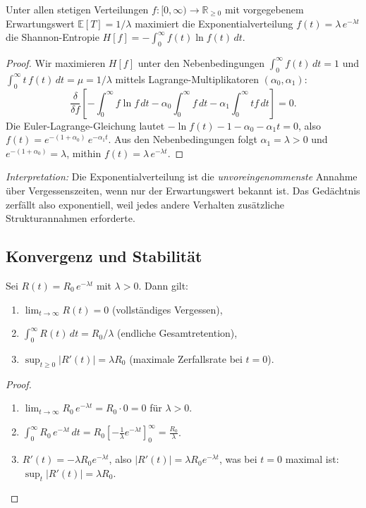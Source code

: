 ﻿\documentclass[12pt,a4paper,twoside]{article}
\theoremstyle{theormstyle}
\theoremstyle{proofstyle}
\begin{document}
		Unter allen stetigen Verteilungen $f : [0,\infty) \to \mathbb{R}_{\geq 0}$
		mit vorgegebenem Erwartungswert $\mathbb{E}[T] = 1/\lambda$ maximiert die
		Exponentialverteilung
		$f(t) = \lambda\,e^{-\lambda t}$
		die Shannon-Entropie
		$H[f] = -\int_0^\infty f(t)\ln f(t)\,dt$.
	
	\begin{proof}
		Wir maximieren $H[f]$ unter den Nebenbedingungen
		$\int_0^\infty f(t)\,dt = 1$ und $\int_0^\infty t\,f(t)\,dt = \mu = 1/\lambda$
		mittels Lagrange-Multiplikatoren $(\alpha_0, \alpha_1)$:
		\[
		\frac{\delta}{\delta f}\!\left[
		-\!\int_0^\infty f\ln f\,dt
		- \alpha_0\!\int_0^\infty f\,dt
		- \alpha_1\!\int_0^\infty t f\,dt
		\right] = 0.
		\]
		Die Euler-Lagrange-Gleichung lautet
		$-\ln f(t) - 1 - \alpha_0 - \alpha_1 t = 0$, also
		$f(t) = e^{-(1+\alpha_0)}\,e^{-\alpha_1 t}$.
		Aus den Nebenbedingungen folgt $\alpha_1 = \lambda > 0$ und
		$e^{-(1+\alpha_0)} = \lambda$, mithin $f(t) = \lambda\,e^{-\lambda t}$.
	\end{proof}
	
	\textit{Interpretation:} Die Exponentialverteilung ist die \emph{unvoreingenommenste}
	Annahme über Vergessenszeiten, wenn nur der Erwartungswert bekannt ist.
	Das Gedächtnis zerfällt also exponentiell, weil jedes andere Verhalten
	zusätzliche Strukturannahmen erforderte.
	
	\subsection{Konvergenz und Stabilität}
	
		Sei $R(t) = R_0\,e^{-\lambda t}$ mit $\lambda > 0$. Dann gilt:
		\begin{enumerate}[label=(\roman*)]
			\item $\lim_{t\to\infty} R(t) = 0$ (vollständiges Vergessen),
			\item $\int_0^\infty R(t)\,dt = R_0/\lambda$ (endliche Gesamtretention),
			\item $\sup_{t \geq 0} |R'(t)| = \lambda R_0$ (maximale Zerfallsrate bei $t=0$).
		\end{enumerate}
	
	\begin{proof}
		\begin{enumerate}[label=(\roman*)]
			\item $\lim_{t\to\infty} R_0\,e^{-\lambda t} = R_0 \cdot 0 = 0$
			für $\lambda > 0$. \hfill
			\item $\int_0^\infty R_0\,e^{-\lambda t}\,dt
			= R_0\left[-\frac{1}{\lambda}e^{-\lambda t}\right]_0^\infty
			= \frac{R_0}{\lambda}$. \hfill
			\item $R'(t) = -\lambda R_0 e^{-\lambda t}$, also $|R'(t)| = \lambda R_0 e^{-\lambda t}$,
			was bei $t=0$ maximal ist: $\sup_t |R'(t)| = \lambda R_0$. \hfill
		\end{enumerate}
	\end{proof}
	
\end{document}
